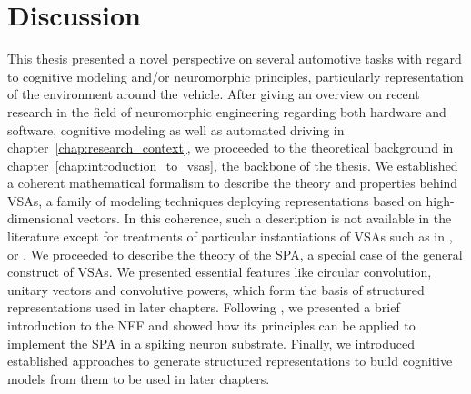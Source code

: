 \chapter{Discussion}%
\label{chap:discussion}

This thesis presented a novel perspective on several automotive tasks with regard to cognitive modeling and/or neuromorphic principles, particularly representation of the environment around the vehicle.
After giving an overview on recent research in the field of neuromorphic engineering regarding both hardware and software, cognitive modeling as well as automated driving in chapter~\ref{chap:research_context}, we proceeded to the theoretical background in chapter~\ref{chap:introduction_to_vsas}, the backbone of the thesis.
We established a coherent mathematical formalism to describe the theory and properties behind \acp{VSA}, a family of modeling techniques deploying representations based on high-dimensional vectors.
In this coherence, such a description is not available in the literature except for treatments of particular instantiations of \acp{VSA} such as in \cite{Plate1994}, \cite{Gayler1998} or \cite{Kanerva2009}.
We proceeded to describe the theory of the \ac{SPA}, a special case of the general construct of \acp{VSA}.
We presented essential features like circular convolution, unitary vectors and convolutive powers, which form the basis of structured representations used in later chapters.
Following \cite{Eliasmith2003}, we presented a brief introduction to the \ac{NEF} and showed how its principles can be applied to implement the \ac{SPA} in a spiking neuron substrate.
Finally, we introduced established approaches to generate structured representations to build cognitive models from them to be used in later chapters.


